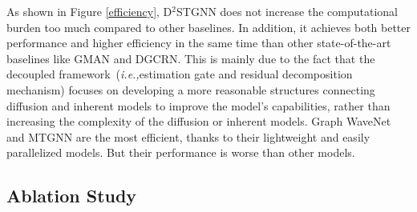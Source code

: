 \documentclass[sigconf, nonacm]{acmart}
\newcommand{\ie}{\textit{i.e.,}\xspace}
\begin{document}
As shown in Figure \ref{efficiency}, D$^2$STGNN does not increase the computational burden too much compared to other baselines.
In addition, it achieves both better performance and higher efficiency in the same time than other state-of-the-art baselines like GMAN and DGCRN.
This is mainly due to the fact that the decoupled framework~(\ie  {\color{black}estimation} gate and residual decomposition mechanism) focuses on developing a more reasonable structures connecting {\color{black}diffusion and inherent models} to improve the model's capabilities, rather than increasing the complexity of the {\color{black}diffusion or inherent models}.
Graph WaveNet and MTGNN are the most efficient, thanks to their lightweight and easily parallelized models. But their performance is worse than other models. \subsection{Ablation Study}
\label{sec_abs}
\end{document}
